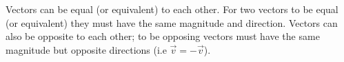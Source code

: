 \documentclass[14pt]{article}
\begin{document}
\begin{flushleft}
\begin{itemize}
{                    \begin{center}


                    \end{center}
                                        
                } 

            \end{itemize}

            Vectors can be equal (or equivalent) to each other. For two vectors to be equal (or equivalent) 
            they must have the same magnitude and direction. Vectors can also be opposite to each other; to be
            opposing vectors must have the same magnitude but opposite directions 
            (i.e $\vec{v} = -\vec{v}$).


\end{flushleft}
\end{document}
